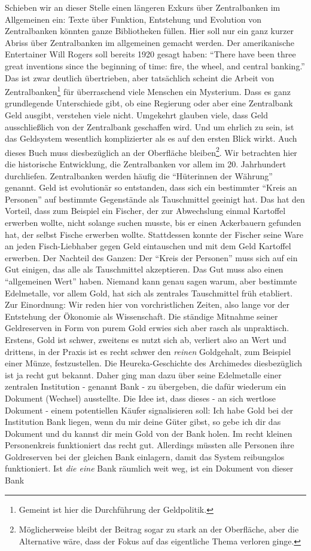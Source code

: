 Schieben wir an dieser Stelle einen längeren Exkurs über Zentralbanken im Allgemeinen ein: Texte über Funktion, Entstehung und Evolution von Zentralbanken könnten ganze Bibliotheken füllen. Hier soll nur ein ganz kurzer Abriss über Zentralbanken im allgemeinen gemacht werden. Der amerikanische Entertainer Will Rogers soll bereits 1920 gesagt haben: "`There have been three great inventions since the beginning of time: fire, the wheel, and central banking."' Das ist zwar deutlich übertrieben, aber tatsächlich scheint die Arbeit von Zentralbanken\footnote{Gemeint ist hier die Durchführung der Geldpolitik.} für überraschend viele Menschen ein Mysterium. Dass es ganz grundlegende Unterschiede gibt, ob eine Regierung oder aber eine Zentralbank Geld ausgibt, verstehen viele nicht. Umgekehrt glauben viele, dass Geld ausschließlich von der Zentralbank geschaffen wird. Und um ehrlich zu sein, ist das Geldsystem wesentlich komplizierter als es auf den ersten Blick wirkt. Auch dieses Buch muss diesbezüglich an der Oberfläche bleiben\footnote{Möglicherweise bleibt der Beitrag sogar zu stark an der Oberfläche, aber die Alternative wäre, dass der Fokus auf das eigentliche Thema verloren ginge.}. Wir betrachten hier die historische Entwicklung, die Zentralbanken vor allem im 20. Jahrhundert durchliefen. Zentralbanken werden häufig die "`Hüterinnen der Währung"' genannt. Geld ist evolutionär so entstanden, dass sich ein bestimmter "`Kreis an Personen"' auf bestimmte Gegenstände als Tauschmittel geeinigt hat. Das hat den Vorteil, dass zum Beispiel ein Fischer, der zur Abwechslung einmal Kartoffel erwerben wollte, nicht solange suchen musste, bis er einen Ackerbauern gefunden hat, der selbst Fische erwerben wollte. Stattdessen konnte der Fischer seine Ware an jeden Fisch-Liebhaber gegen Geld eintauschen und mit dem Geld Kartoffel erwerben. Der Nachteil des Ganzen: Der "`Kreis der Personen"' muss sich auf ein Gut einigen, das alle als Tauschmittel akzeptieren. Das Gut muss also einen "`allgemeinen Wert"' haben. Niemand kann genau sagen warum, aber bestimmte Edelmetalle, vor allem Gold, hat sich als zentrales Tauschmittel früh etabliert. Zur Einordnung: Wir reden hier von vorchristlichen Zeiten, also lange vor der Entstehung der Ökonomie als Wissenschaft. Die ständige Mitnahme seiner Geldreserven in Form von purem Gold erwies sich aber rasch als unpraktisch. Erstens, Gold ist schwer, zweitens es nutzt sich ab, verliert also an Wert und drittens, in der Praxis ist es recht schwer den \textit{reinen} Goldgehalt, zum Beispiel einer Münze, festzustellen. Die Heureka-Geschichte des Archimedes diesbezüglich ist ja recht gut bekannt. Daher ging man dazu über seine Edelmetalle einer zentralen Institution - genannt Bank - zu übergeben, die dafür wiederum ein Dokument (Wechsel) ausstellte. Die Idee ist, dass dieses - an sich wertlose Dokument - einem potentiellen Käufer signalisieren soll: Ich habe Gold bei der Institution Bank liegen, wenn du mir deine Güter gibst, so gebe ich dir das Dokument und du kannst dir mein Gold von der Bank holen. Im recht kleinen Personenkreis funktioniert das recht gut. Allerdings müssten alle Personen ihre Goldreserven bei der gleichen Bank einlagern, damit das System reibungslos funktioniert. Ist \textit{die eine} Bank räumlich weit weg, ist ein Dokument von dieser Bank 